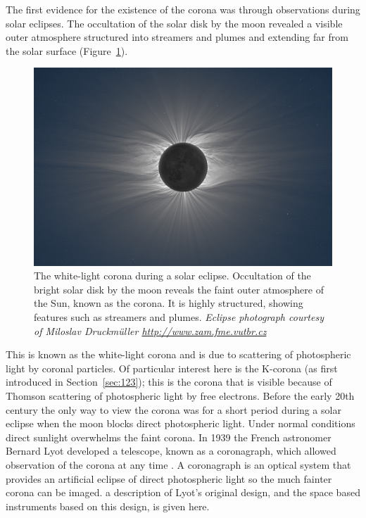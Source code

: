 The first evidence for the existence of the corona was through observations during solar eclipses. The occultation of the solar disk by the moon revealed a visible outer atmosphere structured into streamers and plumes and extending far from the solar surface (Figure~\ref{fig:seclipse}). 
\begin{figure}[!t]
\begin{center}
\includegraphics[scale=0.45]{images/solar_eclipse}
\caption[White-light corona during an eclipse]{The white-light corona during a solar eclipse. Occultation of the bright solar disk by the moon reveals the faint outer atmosphere of the Sun, known as the corona. It is highly structured, showing features such as streamers and plumes. {\it Eclipse photograph courtesy of Miloslav Druckm\"{u}ller \href{http://www.zam.fme.vutbr.cz/~druck/Index.htm}{http://www.zam.fme.vutbr.cz}}}
\label{fig:seclipse}
\end{center}
\end{figure}
This is known as the white-light corona and is due to scattering of photospheric light by coronal particles. Of particular interest here is the K-corona (as first introduced in Section~\ref{sec:123}); this is the corona that is visible because of Thomson scattering of photospheric light by free electrons. 
Before the early 20th century the only way to view the corona was for a short period during a solar eclipse when the moon blocks direct photospheric light. Under normal conditions direct sunlight overwhelms the faint corona. In 1939 the French astronomer Bernard Lyot developed a telescope, known as a coronagraph, which allowed observation of the corona at any time \citep{lyot1939}. A coronagraph is an optical system that provides an artificial eclipse of direct photospheric light so the much fainter corona can be imaged. a description of Lyot's original design, and the space based instruments based on this design, is given here.

